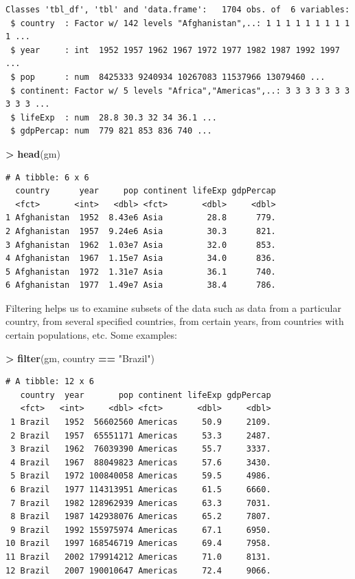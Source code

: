 \documentclass[
]{krantz}
\makeatletter
\newenvironment{Shaded}{\begin{snugshade}}{\end{snugshade}}
\newcommand{\KeywordTok}[1]{\textcolor[rgb]{0.27,0.27,0.27}{\textbf{#1}}}
\newcommand{\NormalTok}[1]{#1}
\newcommand{\OperatorTok}[1]{\textcolor[rgb]{0.43,0.43,0.43}{\textbf{#1}}}
\newcommand{\StringTok}[1]{\textcolor[rgb]{0.5,0.5,0.5}{#1}}
\newenvironment{kframe}{%
\medskip{}
\setlength{\fboxsep}{.8em}
 \def\at@end@of@kframe{}%
 \ifinner\ifhmode%
  \def\at@end@of@kframe{\end{minipage}}%
  \begin{minipage}{\columnwidth}%
 \fi\fi%
 \def\FrameCommand##1{\hskip\@totalleftmargin \hskip-\fboxsep
 \colorbox{shadecolor}{##1}\hskip-\fboxsep
     \hskip-\linewidth \hskip-\@totalleftmargin \hskip\columnwidth}%
 \MakeFramed {\advance\hsize-\width
   \@totalleftmargin\z@ \linewidth\hsize
   \@setminipage}}%
 {\par\unskip\endMakeFramed%
 \at@end@of@kframe}
\renewenvironment{Shaded}{\begin{kframe}}{\end{kframe}}
\makeatother
\begin{document}
\begin{verbatim}
Classes 'tbl_df', 'tbl' and 'data.frame':   1704 obs. of  6 variables:
 $ country  : Factor w/ 142 levels "Afghanistan",..: 1 1 1 1 1 1 1 1 1 1 ...
 $ year     : int  1952 1957 1962 1967 1972 1977 1982 1987 1992 1997 ...
 $ pop      : num  8425333 9240934 10267083 11537966 13079460 ...
 $ continent: Factor w/ 5 levels "Africa","Americas",..: 3 3 3 3 3 3 3 3 3 3 ...
 $ lifeExp  : num  28.8 30.3 32 34 36.1 ...
 $ gdpPercap: num  779 821 853 836 740 ...
\end{verbatim}

\begin{Shaded}
\begin{Highlighting}[]
\OperatorTok{\textgreater{}}\StringTok{ }\KeywordTok{head}\NormalTok{(gm)}
\end{Highlighting}
\end{Shaded}

\begin{verbatim}
# A tibble: 6 x 6
  country      year     pop continent lifeExp gdpPercap
  <fct>       <int>   <dbl> <fct>       <dbl>     <dbl>
1 Afghanistan  1952  8.43e6 Asia         28.8      779.
2 Afghanistan  1957  9.24e6 Asia         30.3      821.
3 Afghanistan  1962  1.03e7 Asia         32.0      853.
4 Afghanistan  1967  1.15e7 Asia         34.0      836.
5 Afghanistan  1972  1.31e7 Asia         36.1      740.
6 Afghanistan  1977  1.49e7 Asia         38.4      786.
\end{verbatim}

Filtering helps us to examine subsets of the data such as data from a particular country, from several specified countries, from certain years, from countries with certain populations, etc. Some examples:

\begin{Shaded}
\begin{Highlighting}[]
\OperatorTok{\textgreater{}}\StringTok{ }\KeywordTok{filter}\NormalTok{(gm, country }\OperatorTok{==}\StringTok{ "Brazil"}\NormalTok{)}
\end{Highlighting}
\end{Shaded}

\begin{verbatim}
# A tibble: 12 x 6
   country  year       pop continent lifeExp gdpPercap
   <fct>   <int>     <dbl> <fct>       <dbl>     <dbl>
 1 Brazil   1952  56602560 Americas     50.9     2109.
 2 Brazil   1957  65551171 Americas     53.3     2487.
 3 Brazil   1962  76039390 Americas     55.7     3337.
 4 Brazil   1967  88049823 Americas     57.6     3430.
 5 Brazil   1972 100840058 Americas     59.5     4986.
 6 Brazil   1977 114313951 Americas     61.5     6660.
 7 Brazil   1982 128962939 Americas     63.3     7031.
 8 Brazil   1987 142938076 Americas     65.2     7807.
 9 Brazil   1992 155975974 Americas     67.1     6950.
10 Brazil   1997 168546719 Americas     69.4     7958.
11 Brazil   2002 179914212 Americas     71.0     8131.
12 Brazil   2007 190010647 Americas     72.4     9066.
\end{verbatim}
\end{document}
